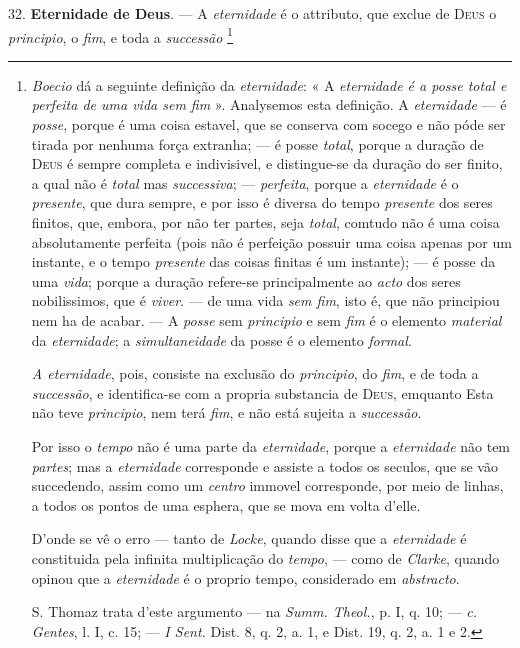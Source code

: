  32. \textbf{Eternidade de Deus}. --- A \emph{eternidade} é o attributo, que exclue de \textsc{Deus} o \emph{principio}, o \emph{fim}, e toda a \emph{successão} \footnote{\emph{Boecio} dá a seguinte definição da \emph{eternidade}: « A \emph{eternidade é a posse total e perfeita de uma vida sem fim} ». Analysemos esta definição. A \emph{eternidade} --- é \emph{posse}, porque é uma coisa estavel, que se conserva com socego e não póde ser tirada por nenhuma força extranha; --- é posse \emph{total}, porque a duração de \textsc{Deus} é sempre completa e indivisivel, e distingue-se da duração do ser finito, a qual não é \emph{total} mas \emph{successiva}; --- \emph{perfeita}, porque a \emph{eternidade} é o \emph{presente}, que dura sempre, e por isso é diversa do tempo \emph{presente} dos seres finitos, que, embora, por não ter partes, seja \emph{total}, comtudo não é uma coisa absolutamente perfeita (pois não é perfeição possuir uma coisa apenas por um instante, e o tempo \emph{presente} das coisas finitas é um instante); --- é posse da uma \emph{vida}; porque a duração refere-se principalmente ao \emph{acto} dos seres nobilissimos, que é \emph{viver}. --- de uma vida \emph{sem fim}, isto é, que não principiou nem ha de acabar. --- A \emph{posse} sem \emph{principio} e sem \emph{fim} é o elemento \emph{material} da \emph{eternidade}; a \emph{simultaneidade} da posse é o elemento \emph{formal}.\par \emph{A eternidade}, pois, consiste na exclusão do \emph{principio}, do \emph{fim}, e de toda a \emph{successão}, e identifica-se com a propria substancia de \textsc{Deus}, emquanto Esta não teve \emph{principio}, nem terá \emph{fim}, e não está sujeita a \emph{successão}.\par Por isso o \emph{tempo} não é uma parte da \emph{eternidade}, porque a \emph{eternidade} não tem \emph{partes}; mas a \emph{eternidade} corresponde e assiste a todos os seculos, que se vão succedendo, assim como um \emph{centro} immovel corresponde, por meio de linhas, a todos os pontos de uma esphera, que se mova em volta d'elle.\par D'onde se vê o erro --- tanto de \emph{Locke}, quando disse que a \emph{eternidade} é constituida pela infinita multiplicação do \emph{tempo}, --- como de \emph{Clarke}, quando opinou que a \emph{eternidade} é o proprio tempo, considerado em \emph{abstracto}.\par S. Thomaz trata d'este argumento --- na \emph{Summ. Theol.}, p. I, q. 10; --- \emph{c. Gentes}, l. I, c. 15; --- \emph{I Sent.} Dist. 8, q. 2, a. 1, e Dist. 19, q. 2, a. 1 e 2.}

